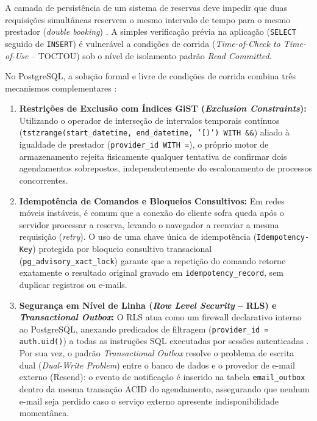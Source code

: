 \documentclass[12pt,a4paper]{article}
\begin{document}
A camada de persistência de um sistema de reservas deve impedir que duas requisições simultâneas reservem o mesmo intervalo de tempo para o mesmo prestador (\textit{double booking}) \cite{elmasri2018, postgres_isolation}. A simples verificação prévia na aplicação (\texttt{SELECT} seguido de \texttt{INSERT}) é vulnerável a condições de corrida (\textit{Time-of-Check to Time-of-Use} -- TOCTOU) sob o nível de isolamento padrão \textit{Read Committed}.

No PostgreSQL, a solução formal e livre de condições de corrida combina três mecanismos complementares \cite{postgres_isolation}:
\begin{enumerate}
    \item \textbf{Restrições de Exclusão com Índices GiST (\textit{Exclusion Constraints}):} Utilizando o operador de interseção de intervalos temporais contínuos (\texttt{tstzrange(start\_datetime, end\_datetime, '[)') WITH \&\&}) aliado à igualdade de prestador (\texttt{provider\_id WITH =}), o próprio motor de armazenamento rejeita fisicamente qualquer tentativa de confirmar dois agendamentos sobrepostos, independentemente do escalonamento de processos concorrentes.
    \item \textbf{Idempotência de Comandos e Bloqueios Consultivos:} Em redes móveis instáveis, é comum que a conexão do cliente sofra queda após o servidor processar a reserva, levando o navegador a reenviar a mesma requisição (\textit{retry}). O uso de uma chave única de idempotência (\texttt{Idempotency-Key}) protegida por bloqueio consultivo transacional (\texttt{pg\_advisory\_xact\_lock}) garante que a repetição do comando retorne exatamente o resultado original gravado em \texttt{idempotency\_record}, sem duplicar registros ou e-mails.
    \item \textbf{Segurança em Nível de Linha (\textit{Row Level Security} -- RLS) e \textit{Transactional Outbox}:} O RLS atua como um firewall declarativo interno ao PostgreSQL, anexando predicados de filtragem (\texttt{provider\_id = auth.uid()}) a todas as instruções SQL executadas por sessões autenticadas \cite{medium_rls_explained}. Por sua vez, o padrão \textit{Transactional Outbox} \cite{kleppmann2017} resolve o problema de escrita dual (\textit{Dual-Write Problem}) entre o banco de dados e o provedor de e-mail externo (Resend): o evento de notificação é inserido na tabela \texttt{email\_outbox} dentro da mesma transação ACID do agendamento, assegurando que nenhum e-mail seja perdido caso o serviço externo apresente indisponibilidade momentânea.
\end{enumerate}
\end{document}

